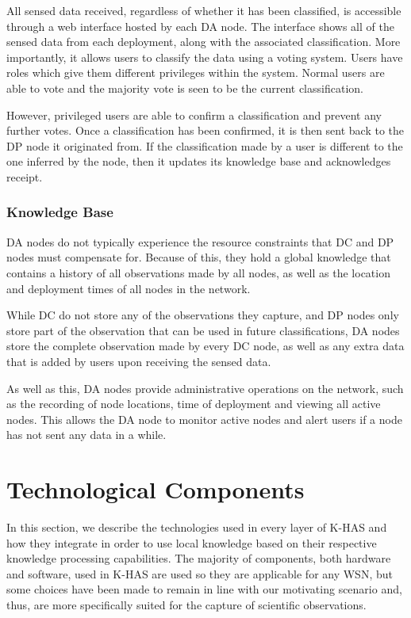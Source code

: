	All sensed data received, regardless of whether it has been classified, is accessible through a web interface hosted by each DA node. The interface shows all of the sensed data from each deployment, along with the associated classification. More importantly, it allows users to classify the data using a voting system. Users have roles which give them different privileges within the system. Normal users are able to vote and the majority vote is seen to be the current classification.
	
	However, privileged users are able to confirm a classification and prevent any further votes. Once a classification has been confirmed, it is then sent back to the DP node it originated from. If the classification made by a user is different to the one inferred by the node, then it updates its knowledge base and acknowledges receipt.
	
	\subsubsection{Knowledge Base}
	DA nodes do not typically experience the resource constraints that DC and DP nodes must compensate for. Because of this, they hold a global knowledge that contains a history of all observations made by all nodes, as well as the location and deployment times of all nodes in the network.
	
	While DC do not store any of the observations they capture, and DP nodes only store part of the observation that can be used in future classifications, DA nodes store the complete observation made by every DC node, as well as any extra data that is added by users upon receiving the sensed data.
	
	As well as this, DA nodes provide administrative operations on the network, such as the recording of node locations, time of deployment and viewing all active nodes. This allows the DA node to monitor active nodes and alert users if a node has not sent any data in a while.
	
	
	\section{Technological Components}
	In this section, we describe the technologies used in every layer of K-HAS and how they integrate in order to use local knowledge based on their respective knowledge processing capabilities. The majority of components, both hardware and software, used in K-HAS are used so they are applicable for any WSN, but some choices have been made to remain in line with our motivating scenario and, thus, are more specifically suited for the capture of scientific observations.
	
